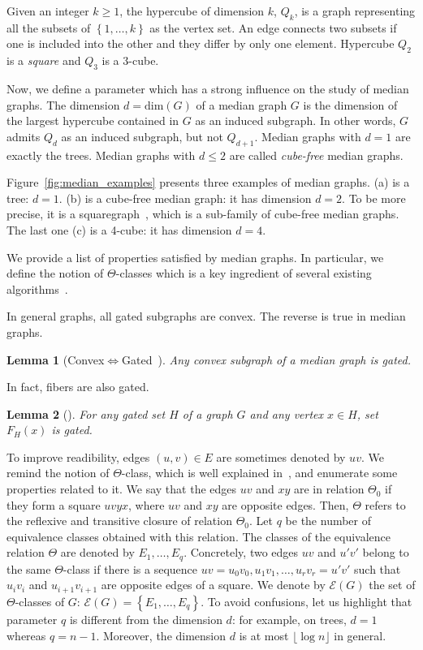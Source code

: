 \documentclass[11pt,letterpaper]{article}
\newtheorem{lemma}{Lemma}
\newcommand{\set}[1]{\left\{ #1 \right\}}
\begin{document}
Given an integer $k \ge 1$, the hypercube of dimension $k$, $Q_k$, is a graph representing all the subsets of $\set{1,\ldots,k}$ as the vertex set. An edge connects two subsets if one is included into the other and they differ by only one element. Hypercube $Q_2$ is a \textit{square} and $Q_3$ is a $3$-cube.

Now, we define a parameter which has a strong influence on the study of median graphs.
The dimension $d = \mbox{dim}(G)$ of a median graph $G$ is the dimension of the largest hypercube contained in $G$ as an induced subgraph.
In other words, $G$ admits $Q_d$ as an induced subgraph, but not $Q_{d+1}$. Median graphs with $d=1$ are exactly the trees. Median graphs with $d\le 2$ are called \textit{cube-free} median graphs.

Figure~\ref{fig:median_examples} presents three examples of median graphs. (a) is a tree: $d=1$. (b) is a cube-free median graph: it has dimension $d=2$. To be more precise, it is a squaregraph~\cite{BaChEp10}, which is a sub-family of cube-free median graphs. The last one (c) is a 4-cube: it has dimension $d=4$. 

We provide a list of properties satisfied by median graphs. In particular, we define the notion of $\Theta$-classes which is a key ingredient of several existing algorithms~\cite{BeChChVa20,HaImKl99,ImKlMu99}.

In general graphs, all gated subgraphs are convex. The reverse is true in median graphs.
\begin{lemma}[Convex$\Leftrightarrow$Gated~\cite{BaCh08,BeChChVa20}]
Any convex subgraph of a median graph is gated.
\end{lemma}

In fact, fibers are also gated.

\begin{lemma}[\cite{Ch01,ChLaRa19}]
For any gated set $H$ of a graph $G$ and any vertex $x\in H$, set $F_H(x)$ is gated.
\end{lemma}

To improve readibility, edges $(u,v) \in E$ are sometimes denoted by $uv$. We remind the notion of $\Theta$-class, which is well explained in~\cite{BeChChVa20}, and enumerate some properties related to it. We say that the edges $uv$ and $xy$ are in relation $\Theta_0$ if they form a square $uvyx$, where $uv$ and $xy$ are opposite edges. Then, $\Theta$ refers to the reflexive and transitive closure of relation $\Theta_0$. Let $q$ be the number of equivalence classes obtained with this relation. The classes of the equivalence relation $\Theta$ are denoted by $E_1,\ldots,E_q$. Concretely, two edges $uv$ and $u'v'$ belong to the same $\Theta$-class if there is a sequence $uv = u_0v_0, u_1v_1, \ldots, u_rv_r= u'v'$ such that $u_iv_i$ and $u_{i+1}v_{i+1}$ are opposite edges of a square. We denote by $\mathcal{E}(G)$ the set of $\Theta$-classes of $G$: $\mathcal{E}(G) = \set{E_1,\ldots,E_q}$. To avoid confusions, let us highlight that parameter $q$ is different from the dimension $d$: for example, on trees, $d=1$ whereas $q = n-1$. Moreover, the dimension $d$ is at most $\lfloor \log n \rfloor$ in general.
\end{document}
